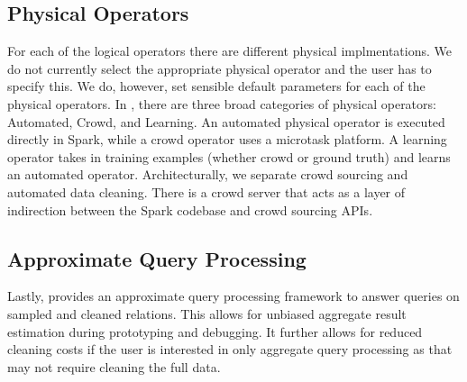 \subsection{Physical Operators}
For each of the logical operators there are different physical implmentations.
We do not currently select the appropriate physical operator and the user has to specify this.
We do, however, set sensible default parameters for each of the physical operators.
In \projx, there are three broad categories of physical operators: Automated, Crowd, and Learning.
An automated physical operator is executed directly in Spark, while a crowd operator uses a microtask platform.
A learning operator takes in training examples (whether crowd or ground truth) and learns an automated operator.
Architecturally, we separate crowd sourcing and automated data cleaning.
There is a crowd server that acts as a layer of indirection between the Spark codebase and crowd sourcing APIs.

\subsection{Approximate Query Processing}
Lastly, \projx provides an approximate query processing framework to answer queries on sampled and cleaned relations.
This allows for unbiased aggregate result estimation during prototyping and debugging.
It further allows for reduced cleaning costs if the user is interested in only aggregate query processing as that may
not require cleaning the full data.  







